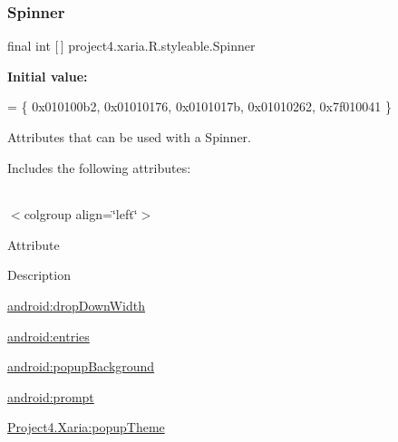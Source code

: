 \subsubsection{\texorpdfstring{Spinner}{Spinner}}
{\footnotesize\ttfamily final int \mbox{[}$\,$\mbox{]} project4.\+xaria.\+R.\+styleable.\+Spinner\hspace{0.3cm}{\ttfamily [static]}}

{\bfseries Initial value\+:}
\begin{DoxyCode}
= \{
            0x010100b2, 0x01010176, 0x0101017b, 0x01010262,
            0x7f010041
        \}
\end{DoxyCode}
Attributes that can be used with a Spinner. 

Includes the following attributes\+:

\tabulinesep=1mm
\begin{longtabu} spread 0pt [c]{*{0}{|X[-1]}|}
\hline
\end{longtabu}
$<$colgroup align=\char`\"{}left\char`\"{}$>$ 

Attribute

Description 

{\ttfamily \hyperlink{classproject4_1_1xaria_1_1R_1_1styleable_aac6855533bf73e07082f2ba0fc69d86c}{android\+:drop\+Down\+Width}}

{\ttfamily \hyperlink{classproject4_1_1xaria_1_1R_1_1styleable_a15c697b1d47da63eeab7328fb0485ef3}{android\+:entries}}

{\ttfamily \hyperlink{classproject4_1_1xaria_1_1R_1_1styleable_ac3a672ea36ed3127190795a3296ee33c}{android\+:popup\+Background}}

{\ttfamily \hyperlink{classproject4_1_1xaria_1_1R_1_1styleable_a6a2f614c9012639c7b74d674247c4ef8}{android\+:prompt}}

{\ttfamily \hyperlink{classproject4_1_1xaria_1_1R_1_1styleable_a1172c7cabccd79ed9194907191930ce8}{Project4.\+Xaria\+:popup\+Theme}}

